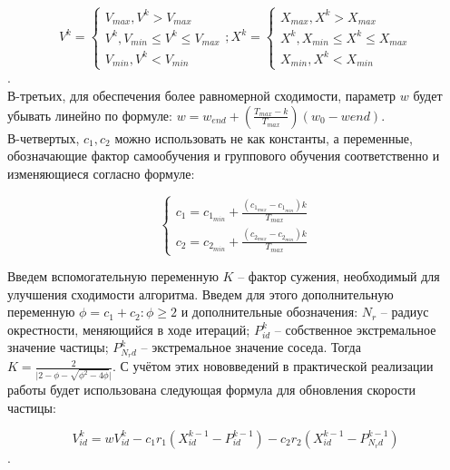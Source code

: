 \begin{equation} \label{advanced_velocity_and_postion_eq}
V^{k} = 
	\begin{cases}
		V_{max}, V^{k} > V_{max} \\
		V^{k}, V_{min} \le V^{k} \le V_{max} \\
		V_{min}, V^{k} < V_{min}
	\end{cases};
X^{k} = 
	\begin{cases}
		X_{max}, X^{k} > X_{max} \\
		X^{k}, X_{min} \le X^{k} \le X_{max} \\
		X_{min}, X^{k} < X_{min}
	\end{cases}
\end{equation}.  \\
В-третьих, для обеспечения более  равномерной сходимости, параметр $w$ будет убывать линейно по формуле: $w = w_{end} + (\frac{T_{max}-k}{T_{max}})(w_0-w{end})$. \\
В-четвертых, $c_1, c_2$ можно использовать не как константы, а переменные, обозначающие фактор самообучения и группового  обучения соответственно и изменяющиеся согласно формуле: 

\begin{equation}
	\begin{cases}
		c_1 = c_{1_{min}} + \frac{(c_{1_{max}} - c_{1_{min}}) k }{T_{max}} \\ 
		c_2 = c_{2_{min}} + \frac{(c_{2_{max}} - c_{2_{min}}) k }{T_{max}}
	\end{cases}
\end{equation}



Введем вспомогательную переменную $K$ -- фактор сужения, необходимый для улучшения сходимости алгоритма. Введем для этого дополнительную переменную $\phi = c_1 + c_2: \phi \ge 2$ и дополнительные обозначения: $N_r$ -- радиус окрестности, меняющийся в ходе итераций; $P_{id}^{k}$ -- собственное экстремальное значение частицы; $P_{N_{r}d}^{k}$ -- экстремальное значение соседа.  Тогда $K = \frac{2}{ \lvert 2 - \phi - \sqrt{\phi ^ 2 - 4 \phi} \rvert}$. С учётом этих нововведений  в практической реализации работы будет использована следующая формула для обновления скорости частицы:

\begin{equation}	\label{best_velocity_and_postion_eq}
	V_{id}^{k} = w V_{id}^{k} - c_1 r_1 (X_{id}^{k-1} - P_{id}^{k-1}) - c_2 r_2 (X_{id}^{k-1} - P_{N_{r}d}^{k-1})
\end{equation}.


